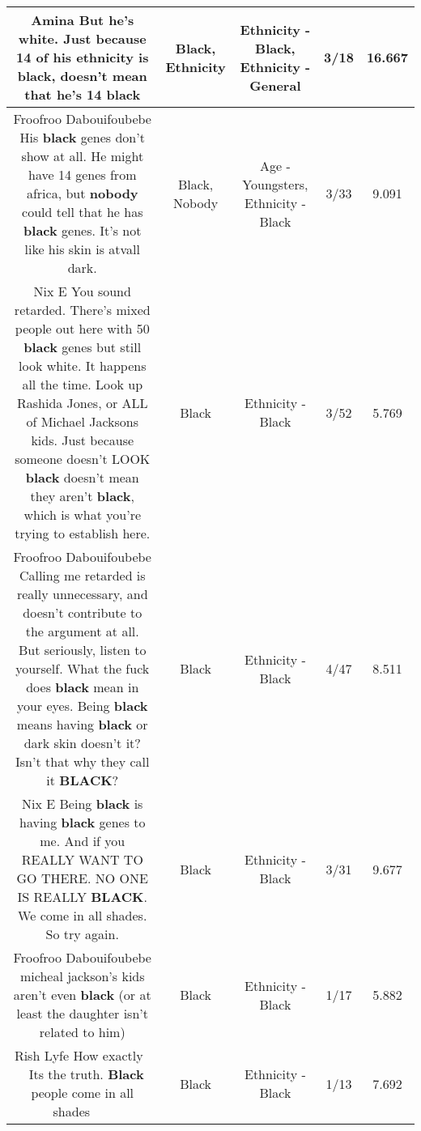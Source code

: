 \documentclass[11pt]{article}
\newlength\mylength
\begin{document}
\begin{center}
\begin{longtable}{|C{.65\mylength}|C{.30\mylength}|C{.12\mylength}|C{.12\mylength}|C{.12\mylength}|}
  \small Amina But he's white. Just because 14 of his \textbf{ethnicity} is \textbf{black}, doesn't mean that he's 14 black\normalsize   & Black, Ethnicity & Ethnicity - Black, Ethnicity - General & 3/18 & 16.667 \\  \hline
  \small Froofroo Dabouifoubebe His \textbf{black} genes don't show at all. He might have 14 genes from africa, but \textbf{nobody} could tell that he has \textbf{black} genes. It's not like his skin is atvall dark.\normalsize   & Black, Nobody & Age - Youngsters, Ethnicity - Black & 3/33 & 9.091 \\  \hline
  \small Nix E You sound retarded. There's mixed people out here with 50 \textbf{black} genes but still look white. It happens all the time. Look up Rashida Jones, or ALL of Michael Jacksons kids. Just because someone doesn't LOOK \textbf{black} doesn't mean they aren't \textbf{black}, which is what you're trying to establish here.\normalsize   & Black & Ethnicity - Black & 3/52 & 5.769 \\  \hline
  \small Froofroo Dabouifoubebe Calling me retarded is really unnecessary, and doesn't contribute to the argument at all. But seriously, listen to yourself. What the fuck does \textbf{black} mean in your eyes. Being \textbf{black} means having \textbf{black} or dark skin doesn't it? Isn't that why they call it \textbf{BLACK}?\normalsize   & Black & Ethnicity - Black & 4/47 & 8.511 \\  \hline
  \small Nix E Being \textbf{black} is having \textbf{black} genes to me. And if you REALLY WANT TO GO THERE. NO ONE IS REALLY \textbf{BLACK}. We come in all shades. So try again.\normalsize   & Black & Ethnicity - Black & 3/31 & 9.677 \\  \hline
  \small Froofroo Dabouifoubebe micheal jackson's kids aren't even \textbf{black} (or at least the daughter isn't related to him)\normalsize   & Black & Ethnicity - Black & 1/17 & 5.882 \\  \hline
  \small Rish Lyfe How exactly🤔🤔🤔 Its the truth. \textbf{Black} people come in all shades🤷‍♀️🤷‍♀️🤷‍♀️\normalsize   & Black & Ethnicity - Black & 1/13 & 7.692 \\  \hline

\end{longtable}
\end{center}
\end{document}

